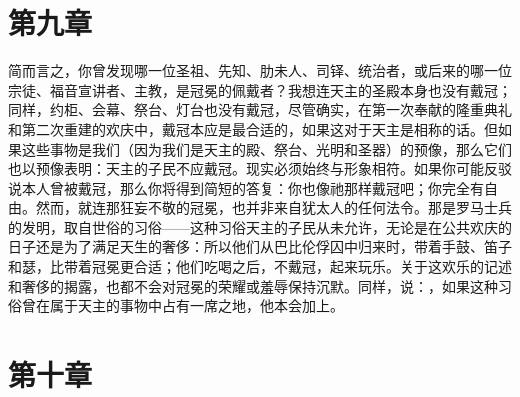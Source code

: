 
\section{第九章}

简而言之，你曾发现哪一位圣祖、先知、肋未人、司铎、统治者，或后来的哪一位宗徒、福音宣讲者、主教，是冠冕的佩戴者？我想连天主的圣殿本身也没有戴冠；同样，约柜、会幕、祭台、灯台也没有戴冠，尽管确实，在第一次奉献的隆重典礼和第二次重建的欢庆中，戴冠本应是最合适的，如果这对于天主是相称的话。但如果这些事物是我们（因为我们是天主的殿、祭台、光明和圣器）的预像，那么它们也以预像表明：天主的子民不应戴冠。现实必须始终与形象相符。如果你可能反驳说本人曾被戴冠，那么你将得到简短的答复：你也像祂那样戴冠吧；你完全有自由。然而，就连那狂妄不敬的冠冕，也并非来自犹太人的任何法令。那是罗马士兵的发明，取自世俗的习俗——这种习俗天主的子民从未允许，无论是在公共欢庆的日子还是为了满足天生的奢侈：所以他们从巴比伦俘囚中归来时，带着手鼓、笛子和瑟，比带着冠冕更合适；他们吃喝之后，不戴冠，起来玩乐。关于这欢乐的记述和奢侈的揭露，也都不会对冠冕的荣耀或羞辱保持沉默。同样，说：，如果这种习俗曾在属于天主的事物中占有一席之地，他本会加上。\par


\section{第十章}

